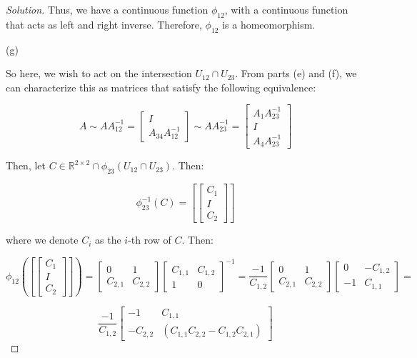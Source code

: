 \documentclass[10pt]{article}
\begin{document}
\begin{proof}[Solution]
Thus, we have a continuous function $\phi_{12}$, with a continuous function that acts as left and right inverse. Therefore, $\phi_{12}$ is a homeomorphism.

(g)

So here, we wish to act on the intersection $U_{12} \cap U_{23}$. From parts (e) and (f), we can characterize this as matrices that satisfy the following equivalence:

$$ A \sim AA^{-1}_{12} = \begin{bmatrix} I \\ A _{34}A^{-1}_{12} \end{bmatrix} \sim AA^{-1}_{23} = \begin{bmatrix} A_{1}A^{-1}_{23} \\ I \\  A_{4}A^{-1}_{23} \end{bmatrix}$$

Then, let $C \in \mathbb{R}^{2 \times 2} \cap \phi_{23}(U_{12} \cap U_{23})$. Then:

$$\phi^{-1}_{23}(C) =  [\begin{bmatrix} C_{1} \\ I \\  C_{2} \end{bmatrix}]$$

where we denote $C_i$ as the $i$-th row of $C$. Then:

$$\phi_{12}(  [\begin{bmatrix} C_{1} \\ I \\  C_{2} \end{bmatrix}]) = \begin{bmatrix} 0 & 1 \\ C_{2,1} & C_{2,2} \end{bmatrix} \begin{bmatrix} C_{1,1} & C_{1,2} \\ 1 & 0 \end{bmatrix}^{-1} = \frac{-1}{C_{1,2}} \begin{bmatrix} 0 & 1 \\ C_{2,1} & C_{2,2} \end{bmatrix} \begin{bmatrix} 0 & -C_{1,2} \\ -1 & C_{1,1} \end{bmatrix} =$$

$$ \frac{-1}{C_{1,2}} \begin{bmatrix} -1 & C_{1,1} \\ -C_{2,2} & (C_{1,1}C_{2,2} - C_{1,2}C_{2,1}) \end{bmatrix} $$


\end{proof}
\end{document}
